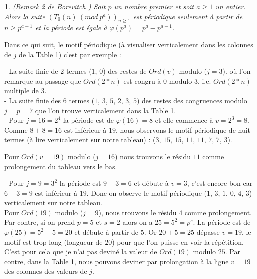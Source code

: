 \documentclass[12pt]{article}
\newtheorem{remark}[definition]{\noindent {\bf Remark}}
\begin{document}
\begin{remark} \label{periode} (Remark 2 de Borevitch \cite{Bor80})
Soit $p$ un nombre premier et soit $a\geq 1$ un entier. Alors la suite $(T_0(n)\ (mod \ p^a))_{n\geq 1}$ est p\'eriodique seulement \`a partir de $n\geq p^{a-1}$ et la p\'eriode est \'egale \`a $\varphi (p^a) = p^a - p^{a-1}$.
\end{remark} 
%


Dans ce qui suit, le motif p\'eriodique (\`a visualiser
verticalement dans les colonnes de $j$ de la Table 1) c'est par
 exemple :
 
 - La suite finie de $2$ termes ($1$, $0$) des restes de $Ord(v)$ modulo ($j = 3$).
 o\`u l'on remarque au passage que $Ord(2 * n)$ est congru \`a $0$ modulo $3$, 
 i.e. $Ord(2 * n)$ multiple  de $3$.\\
 

- La suite finie  des $6$ termes ($1$, $3$, $5$, $2$, $3$, $5$) des restes des congruences
modulo $j = p = 7$ que l'on trouve  verticalement dans  la Table 1.\\


- Pour $j = 16 = 2^4$ la p\'eriode est de $\varphi(16) = 8$ et elle commence \`a $v = 2^3 = 8$.\\
Comme $8 + 8 = 16$ est inf\'erieur  \`a  $19$, nous observons le motif
p\'eriodique de huit termes  (\`a  lire verticalement sur notre tableau) : ($3$,
 $15$, $15$, $11$, $11$, $7$, $7$, $3$).

Pour $Ord(v = 19)$  modulo  ($j = 16$) nous trouvons le r\'esidu $11$ comme
prolongement du tableau vers le bas.

 - Pour $j = 9 = 3^2$ la p\'eriode est $9 - 3 = 6$ et d\'ebute \`a $v = 3$, c'est encore
 bon car $6 + 3 = 9$ est inf\'erieur  \`a $19$. Donc on observe le motif p\'eriodique ($1$, $3$, $1$, $0$, $4$, $3$) verticalement sur notre tableau.\\

Pour $Ord(19)$ modulo ($j = 9$), nous trouvons le r\'esidu $4$ comme prolongement.
Par contre, si on prend $p = 5$ et $s = 2$   alors
on a  $25 = 5^2 = p^s$. La période est de $\varphi(25) = 5^2 - 5 = 20$ et d\'ebute \`a partir de $5$. Or $20 + 5 = 25$  d\'epasse $v = 19$, le motif est trop long (longueur de $20$) pour que l'on puisse en voir la r\'ep\'etition. C'est pour cela que je n'ai pas devin\'e la valeur de $Ord(19)$ modulo $25$. Par contre, dans la Table 1, nous pouvons deviner par prolongation \`a la ligne $v = 19$ des colonnes des valeurs de $j$.
\end{document}
